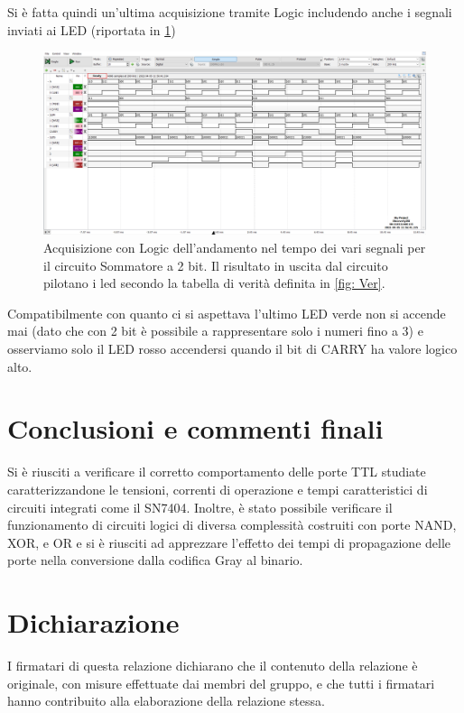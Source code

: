 \documentclass[10pt, a4paper, italian]{article}
\begin{document}
Si è fatta quindi un'ultima acquisizione tramite Logic includendo anche
i segnali inviati ai LED (riportata in \cref{fig: ROM_sommatore})
\begin{figure}[htbp]
    \centering
    \includegraphics[width=\linewidth]{sum_time_ROM}
    \caption{Acquisizione con Logic dell'andamento nel tempo dei vari segnali
    per il circuito Sommatore a 2 bit. Il risultato in uscita dal circuito
    pilotano i led secondo la tabella di verità definita in \cref{fig: Ver}.}
    \label{fig: ROM_sommatore}
\end{figure}
Compatibilmente con quanto ci si aspettava l'ultimo LED verde non si accende
mai (dato che con 2 bit è possibile a rappresentare solo i numeri fino a 3) e
osserviamo solo il LED rosso accendersi quando il bit di CARRY ha valore logico
alto.

\section*{Conclusioni e commenti finali}
Si è riusciti a verificare il corretto comportamento delle porte TTL studiate
caratterizzandone le tensioni, correnti di operazione e tempi caratteristici
di circuiti integrati come il SN7404.
Inoltre, è stato possibile verificare il funzionamento di circuiti logici di
diversa complessità costruiti con porte NAND, XOR, e OR e si è riusciti ad
apprezzare l'effetto dei tempi di propagazione delle porte nella conversione
dalla codifica Gray al binario.

\section*{Dichiarazione}
I firmatari di questa relazione dichiarano che il contenuto della relazione \`e
originale, con misure effettuate dai membri del gruppo, e che tutti i firmatari
hanno contribuito alla elaborazione della relazione stessa.
\end{document}
